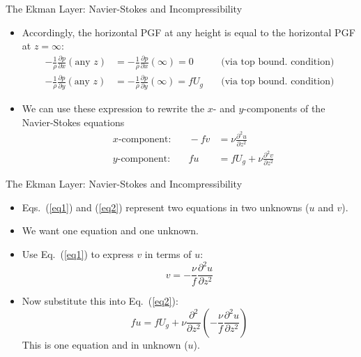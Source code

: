 \begin{frame}{The Ekman Layer: Navier-Stokes and Incompressibility}

\begin{itemize}
	\item Accordingly, the horizontal PGF at any height is equal to the horizontal PGF at $z=\infty$:
	\begin{align*}
		-\frac{1}{\rho}\frac{\partial p}{\partial x}(\text{any $z$})& = -\frac{1}{\rho}\frac{\partial p}{\partial x}(\infty) = 0\quad &\text{(via top bound. condition)}\\
		-\frac{1}{\rho}\frac{\partial p}{\partial y}(\text{any $z$}) &= -\frac{1}{\rho}\frac{\partial p}{\partial y}(\infty) = fU_g\quad &\text{(via top bound. condition)}
	\end{align*}
	\item We can use these expression to rewrite the $x$- and $y$-components of the Navier-Stokes equations
	\begin{align}
	&\text{$x$-component:}&\quad -fv &= \nu \frac{\partial^2 u}{\partial z^2} \label{eq1}\\
	&\text{$y$-component:}&\quad fu &= fU_g + \nu \frac{\partial^2 v}{\partial z^2}\label{eq2}
	\end{align}
\end{itemize}
\end{frame}
\begin{frame}{The Ekman Layer: Navier-Stokes and Incompressibility}

\begin{itemize}
	\item Eqs.~(\ref{eq1}) and (\ref{eq2}) represent two equations in two unknowns ($u$ and $v$).
	\item We want one equation and one unknown.
	\item Use Eq.~(\ref{eq1}) to express $v$ in terms of $u$:
	$$v = -\frac{\nu}{f}\frac{\partial^2 u}{\partial z^2}$$
	\item Now substitute this into Eq.~(\ref{eq2}):
	$$fu = fU_g + \nu\frac{\partial^2}{\partial z^2}\left(-\frac{\nu}{f}\frac{\partial^2 u}{\partial z^2}\right)$$
	This is one equation and in unknown ($u$).
\end{itemize}
\end{frame}
